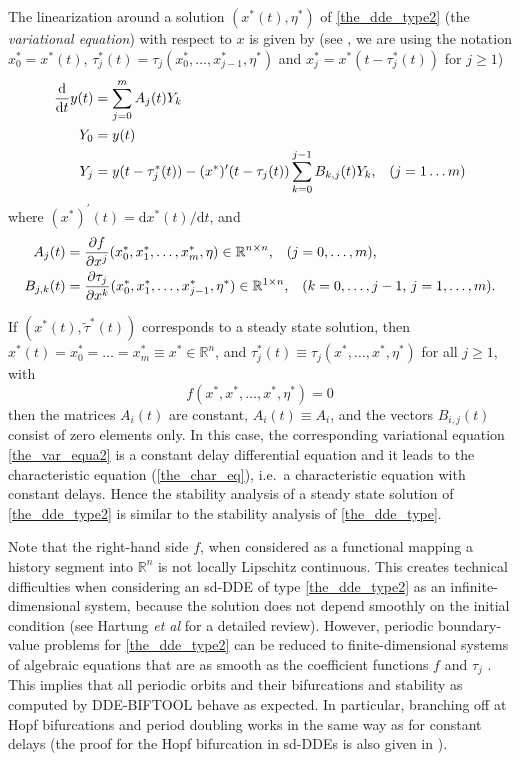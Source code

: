 \documentclass[10pt]{scrartcl}
\newcommand{\DDEBIFCODE}{\textsc{DDE-BIFTOOL}}
\newcommand{\define}[1]{\emph{#1}}
\renewcommand{\d}{\mathrm{d}}
\newcommand{\RR}{\mathbb{R}}
\begin{document}
The linearization around a solution $(x^*(t),\eta^*)$ of
\eqref{the_dde_type2} (the \define{variational equation}) with respect
to $x$ is given by (see \cite{HKWW06}, we are using the notation
$x^*_0=x^*(t)$, $\tau_j^*(t)=\tau_j(x^*_0,\ldots,x^*_{j-1},\eta^*)$ and
$x^*_j=x^*(t-\tau^*_j(t))$ for $j\geq1$)
\begin{equation}\label{the_var_equa2}
\begin{aligned}
\frac{\d}{\d t}{y(t)}&=\sum_{j=0}^mA_j(t)Y_k \\
Y_0&=y(t)\\
Y_j&=y(t-\tau^*_j(t))-(x^*)'(t-\tau_j(t))\sum_{k=0}^{j-1}B_{k,j}(t)Y_k\mbox{,\quad($j=1\ldots m$)}
\end{aligned}
\end{equation}
where $(x^*)^{'}(t)={\d}x^*(t)/{\d}t$, and
\begin{equation}\label{A_def2}
\begin{aligned}
  A_j(t)&=\frac{\partial f}{\partial x^j}(x^*_0,x^*_1,\ldots,x^*_m,\eta)\in\RR^{n\times n}
  \mbox{,\quad ($j=0,\ldots,m$),}\\
  B_{j,k}(t)&=\frac{\partial \tau_j}{\partial x^k}(x^*_0,x^*_1,\ldots,x^*_{j-1},\eta^*)\in\RR^{1\times n}\mbox{,\quad ($k=0,\ldots,j-1$, $j=1,\ldots,m$).} 
\end{aligned}
\end{equation}

If $(x^*(t),\tilde{\tau}^*(t))$ corresponds to a steady state
solution, then $x^*(t)=x^*_0=\ldots=x^*_m\equiv x^*\in\RR^n$, and
$\tau^*_j(t)\equiv \tau_j(x^*,\ldots,x^*,\eta^*)$ for all $j\geq1$, with
\[
f(x^*,x^*,\ldots,x^*,\eta^*)=0
\]
then the matrices $A_i(t)$ are constant, $A_i(t)\equiv A_i$, and the
vectors $B_{i,j}(t)$ consist of zero elements only.  In this case, the
corresponding variational equation \eqref{the_var_equa2} is a constant
delay differential equation and it leads to the characteristic
equation (\ref{the_char_eq}), i.e.~a characteristic equation with
constant delays. Hence the stability analysis of a
steady state solution of \eqref{the_dde_type2} is similar to the
stability analysis of \eqref{the_dde_type}.

Note that the right-hand side $f$, when considered as a functional
mapping a history segment into $\RR^n$ is not locally Lipschitz
continuous. This creates technical difficulties when considering an
sd-DDE of type \eqref{the_dde_type2} as an infinite-dimensional
system, because the solution does not depend smoothly on the
initial condition (see Hartung \emph{et al }\cite{HKWW06} for a
detailed review). However, periodic boundary-value problems for
\eqref{the_dde_type2} can be reduced to finite-dimensional systems of
algebraic equations that are as smooth as the coefficient functions
$f$ and $\tau_j$ \cite{S12}. This implies that all periodic orbits and
their bifurcations and stability as computed by \DDEBIFCODE{} behave as
expected. In particular, branching off at Hopf bifurcations and period
doubling works in the same way as for constant delays (the proof for the Hopf
bifurcation in sd-DDEs is also given in \cite{S12}).
\end{document}
